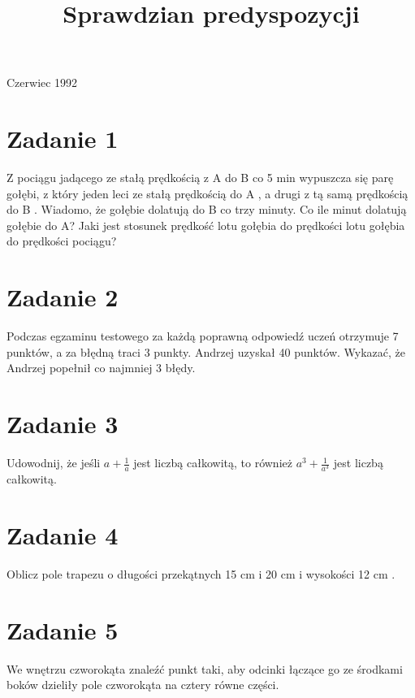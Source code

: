 \documentclass[10pt]{article}
\title{Sprawdzian predyspozycji }
\author{}
\date{}
\begin{document}
\maketitle
Czerwiec 1992

\section*{Zadanie 1}
Z pociągu jadącego ze stałą prędkością z A do B co 5 min wypuszcza się parę gołębi, z który jeden leci ze stałą prędkością do A , a drugi z tą samą prędkością do B . Wiadomo, że gołębie dolatują do B co trzy minuty. Co ile minut dolatują gołębie do A? Jaki jest stosunek prędkość lotu gołębia do prędkości lotu gołębia do prędkości pociągu?

\section*{Zadanie 2}
Podczas egzaminu testowego za każdą poprawną odpowiedź uczeń otrzymuje 7 punktów, a za błędną traci 3 punkty. Andrzej uzyskał 40 punktów. Wykazać, że Andrzej popełnił co najmniej 3 błędy.

\section*{Zadanie 3}
Udowodnij, że jeśli \(a+\frac{1}{a}\) jest liczbą całkowitą, to również \(a^{3}+\frac{1}{a^{3}}\) jest liczbą całkowitą.

\section*{Zadanie 4}
Oblicz pole trapezu o długości przekątnych 15 cm i 20 cm i wysokości 12 cm .

\section*{Zadanie 5}
We wnętrzu czworokąta znaleźć punkt taki, aby odcinki łączące go ze środkami boków dzieliły pole czworokąta na cztery równe części.
\end{document}
